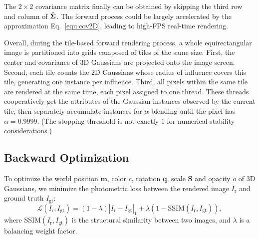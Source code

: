 \documentclass[10pt,twocolumn,letterpaper]{article}
\begin{document}
The $2\times2$ covariance matrix finally can be obtained by skipping the third row and column of $\Tilde{\mathbf{\Sigma}}$. The forward process could be largely accelerated by the approximation Eq.~\eqref{equ:cov2D}, leading to high-FPS real-time rendering.

Overall, during the tile-based forward rendering process, a whole equirectangular image is partitioned into grids composed of tiles of the same size. First, the center and covariance of 3D Gaussians are projected onto the image screen. Second, each tile counts the 2D Gaussians whose radius of influence covers this tile, generating one instance per influence. Third, all pixels within the same tile are rendered at the same time, each pixel assigned to one thread. These threads cooperatively get the attributes of the Gaussian instances observed by the current tile, then separately accumulate instances for $\alpha$-blending until the pixel has $\alpha=0.9999$. (The stopping threshold is not exactly $1$ for numerical stability considerations.)

\subsection{Backward Optimization}\label{subsec:splatting-backward}
To optimize the world position $\mathbf{m}$, color $c$, rotation $\mathbf{q}$, scale $\mathbf{S}$ and opacity $o$ of 3D Gaussians, we minimize the photometric loss between the rendered image $I_\text{r}$ and ground truth $I_\text{gt}$:
\begin{equation}\label{equ:loss}
    \mathcal{L}(I_\text{r},I_\text{gt}) = (1-\lambda)\left|{ I_\text{r} - I_\text{gt} }\right|_1 + \lambda{(1-\text{SSIM}(I_\text{r}, I_\text{gt}))},
\end{equation}
where $\text{SSIM}(I_\text{r}, I_\text{gt})$ is the structural similarity between two images, and $\lambda$ is a balancing weight factor.
\end{document}
